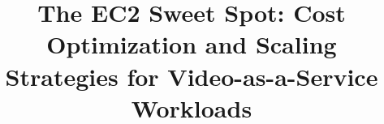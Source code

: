 \documentclass[conference]{IEEEtran}
\begin{document}
\title{The EC2 Sweet Spot: Cost Optimization and Scaling Strategies for Video-as-a-Service Workloads}

\author{
}

\maketitle

\end{document}
